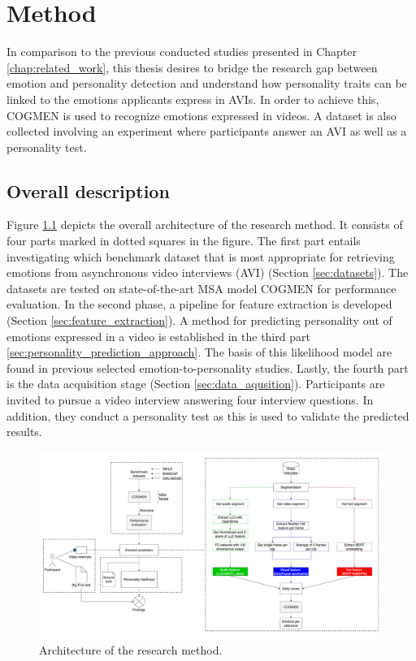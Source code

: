 \chapter{Method}
\label{chap:method}
In comparison to the previous conducted studies presented in Chapter \ref{chap:related_work}, this thesis desires to bridge the research gap between emotion and personality detection and understand how personality traits can be linked to the emotions applicants express in AVIs. In order to achieve this, COGMEN is used to recognize emotions expressed in videos. A dataset is also collected involving an experiment where participants answer an AVI as well as a personality test. 

\section{Overall description}
\label{sec:overall_description}
Figure \ref{fig:research_method} depicts the overall architecture of the research method. It consists of four parts marked in dotted squares in the figure. The first part entails investigating which benchmark dataset that is most appropriate for retrieving emotions from asynchronous video interviews (AVI) (Section \ref{sec:datasets}). The datasets are tested on state-of-the-art MSA model COGMEN for performance evaluation. In the second phase, a pipeline for feature extraction is developed (Section \ref{sec:feature_extraction}). A method for predicting personality out of emotions expressed in a video is established in the third part \ref{sec:personality_prediction_approach}. The basis of this likelihood model are found in previous selected emotion-to-personality studies. Lastly, the fourth part is the data acquisition stage (Section \ref{sec:data_aqusition}). Participants are invited to pursue a video interview answering four interview questions. In addition, they conduct a personality test as this is used to validate the predicted results.  
%
\begin{figure}[h]
  \centering
  \includegraphics[width=\textwidth]{figures/research_method_dpi.png}
  \caption{Architecture of the research method.}
  \label{fig:research_method}
\end{figure}
%
